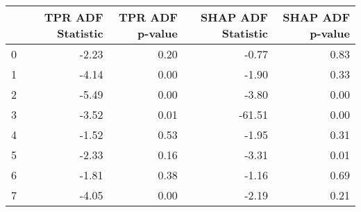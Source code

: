 \begin{tabular}{lrrrr}
\toprule
 & TPR ADF Statistic & TPR ADF p-value & SHAP ADF Statistic & SHAP ADF p-value \\
\midrule
0 & -2.23 & 0.20 & -0.77 & 0.83 \\
1 & -4.14 & 0.00 & -1.90 & 0.33 \\
2 & -5.49 & 0.00 & -3.80 & 0.00 \\
3 & -3.52 & 0.01 & -61.51 & 0.00 \\
4 & -1.52 & 0.53 & -1.95 & 0.31 \\
5 & -2.33 & 0.16 & -3.31 & 0.01 \\
6 & -1.81 & 0.38 & -1.16 & 0.69 \\
7 & -4.05 & 0.00 & -2.19 & 0.21 \\
\bottomrule
\end{tabular}
